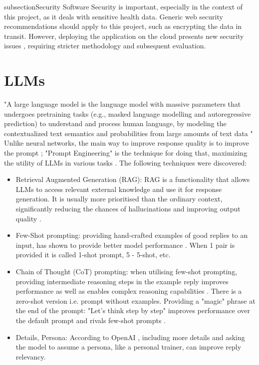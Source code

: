 subsection{Security}
Software Security is important, especially in the context of this project, as it deals with sensitive health data. Generic web security recommendations should apply to this project, such as encrypting the data in transit. However, deploying the application on the cloud presents new security issues \cite{Zissis2012Addressing}, requiring stricter methodology and subsequent evaluation.
\section{LLMs}
"A large language model is the language model with massive
parameters that undergoes pretraining tasks (e.g., masked
language modelling and autoregressive prediction) to understand and process human language, by modeling the
contextualized text semantics and probabilities from large
amounts of text data " \cite{Yao2023ASO}
Unlike neural networks, the main way to improve response quality is to improve the prompt \cite{Liu2021PretrainPA}; "Prompt Engineering" is the technique for doing that, maximizing the utility of LLMs in various tasks \cite{zhou2023large}. The following techniques were discovered:
\begin{itemize}
   \item Retrieval Augmented Generation (RAG): RAG is a functionality that allows LLMs to access relevant external knowledge and use it for response generation. It is usually more prioritised than the ordinary context, significantly reducing the chances of hallucinations and improving output quality \cite{gao2024retrievalaugmented}.
   \item Few-Shot prompting:  providing hand-crafted examples of good replies to an input, has shown to provide better model performance \cite{brown2020language, min2022rethinking}. When 1 pair is provided it is called 1-shot prompt, 5 - 5-shot, etc. 
   \item Chain of Thought (CoT) prompting: when utilising few-shot prompting, providing intermediate reasoning steps in the example reply improves performance as well as enables complex reasoning capabilities \cite{wei2023chainofthought}. There is a zero-shot version i.e. prompt without examples. Providing a "magic" phrase at the end of the prompt: "Let's think step by step" improves performance over the default prompt and rivals few-shot prompts \cite{kojima2023large}.
   \item Details, Persona: According to OpenAI \cite{openAI}, including more details and asking the model to assume a persona, like a personal trainer, can improve reply relevancy. 
\end{itemize}
